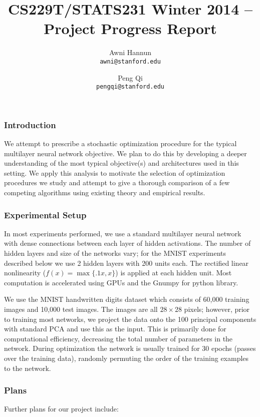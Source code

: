 \documentclass[12pt,english]{article}
\title{
{\large CS229T/STATS231 Winter 2014 -- Project Progress Report }
}
\author{ \large
Awni Hannun \\
\texttt{awni@stanford.edu}
\and
Peng Qi \\
\texttt{pengqi@stanford.edu}
}
\date{}
\newcommand{\1}{\mathbb{I}} %
\begin{document}
\maketitle

\subsubsection*{Introduction}
We attempt to prescribe a stochastic optimization procedure for the typical
multilayer neural network objective. We plan to do this by developing a deeper
understanding of the most typical objective(s) and architectures used in this
setting. We apply this analysis to motivate the selection of optimization
procedures we study and attempt to give a thorough comparison of a few
competing algorithms using existing theory and empirical results. 

\subsubsection*{Experimental Setup}

In most experiments performed, we use a standard multilayer neural network with
dense connections between each layer of hidden activations. The number of
hidden layers and size of the networks vary; for the MNIST experiments
described below we use 2 hidden layers with 200 units each. The rectified
linear nonlinearity ($f(x) = \max\{.1x,x\}$) is applied at each hidden unit. Most
computation is accelerated using GPUs and the Gnumpy for python library. 

We use the MNIST handwritten digits dataset which consists of 60,000 training
images and 10,000 test images. The images are all $28\times28$ pixels; however,
prior to training most networks, we project the data onto the 100 principal
components with standard PCA and use this as the input. This is primarily done
for computational efficiency, decreasing the total number of parameters in the
network. During optimization the network is usually trained for 30 epochs
(passes over the training data), randomly permuting the order of the training
examples to the network.




\subsubsection*{Plans}

Further plans for our project include:
\end{document}
